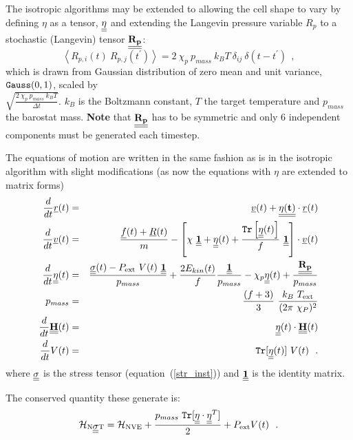 The isotropic algorithms may be extended to allowing
the cell shape to vary by defining $\eta$ as a tensor, $\mbox{$\underline{\underline{\bf \eta}}$}$
and extending the Langevin pressure variable $R_{p}$ to a stochastic
(Langevin) tensor $\mbox{$\underline{\underline{\bf R_{p}}}$}$:
\begin{equation}
\left< R_{p,i}(t)~R_{p,j}(t^\prime)\right> = 2~\chi_{p}~p_{mass}~k_{B}T~\delta_{ij}~\delta(t-t^\prime)~~,
\end{equation}
which is drawn from Gaussian distribution of zero mean and
unit variance, ${\tt Gauss}(0,1)$, scaled by \\
$\sqrt{\frac{2~\chi_{p}~p_{mass}~k_{B}T}{\Delta t}}$.
$k_{B}$ is the Boltzmann constant, $T$ the target temperature
and $p_{mass}$ the barostat mass.  {\bf Note} that $\mbox{$\underline{\underline{\bf R_{p}}}$}$
has to be symmetric and only 6 independent components must
be generated each timestep.

The equations of motion are written in the same fashion as is in the
isotropic algorithm with slight modifications (as now the equations
with $\eta$ are extended to matrix forms)
\begin{eqnarray}
\frac{d}{dt} \mbox{$\underline{r}$}(t) &=& \mbox{$\underline{v}$}(t) + \mbox{$\underline{\underline{\bf \eta (t)}}$} \cdot \mbox{$\underline{r}$}(t) \nonumber \\
\frac{d}{dt} \mbox{$\underline{v}$}(t) &=& \frac{\mbox{$\underline{f}$}(t) + \mbox{$\underline{R}$}(t)}{m} - \left[ \chi~\mbox{$\underline{\underline{\bf 1}}$} +
\mbox{$\underline{\underline{\bf \eta}}$}(t) + \frac{{\tt Tr}\left[\mbox{$\underline{\underline{\bf \eta}}$}(t)\right]}{f}~\mbox{$\underline{\underline{\bf 1}}$} \right] \cdot \mbox{$\underline{v}$}(t) \nonumber \\
\frac{d}{dt}\mbox{$\underline{\underline{\bf \eta}}$}(t) &=& \frac{\mbox{$\underline{\underline{\bf \sigma}}$}(t) -
P_{\rm ext}~V(t)~\mbox{$\underline{\underline{\bf 1}}$}}{p_{mass}} + \frac{2 E_{kin}(t)}{f} \frac{\mbox{$\underline{\underline{\bf 1}}$}}{p_{mass}} -
\chi_{p} \mbox{$\underline{\underline{\bf \eta}}$}(t)  + \frac{\mbox{$\underline{\underline{\bf R_{p}}}$}}{p_{mass}} \\
p_{mass} &=& \frac{(f+3)}{3}~\frac{k_{B}~T_{\rm ext}}{(2 \pi~\chi_{P})^{2}} \nonumber \\
\frac{d}{dt}\mbox{$\underline{\underline{\bf H}}$}(t) &=& \mbox{$\underline{\underline{\bf \eta}}$}(t) \cdot \mbox{$\underline{\underline{\bf H}}$}(t) \nonumber \\
\frac{d}{dt} V(t) &=& {\tt Tr} [\mbox{$\underline{\underline{\bf \eta}}$}(t)]~V(t)~~. \nonumber
\end{eqnarray}
where $\mbox{$\underline{\underline{\bf \sigma}}$}$ is the stress tensor (equation~(\ref{str_inst}))
and $\mbox{$\underline{\underline{\bf 1}}$}$ is the identity matrix.

The conserved quantity these generate is:
\begin{equation}
{\cal H}_{\rm N\mbox{$\underline{\underline{\bf \sigma}}$}T} = {\cal H}_{\rm NVE} + {p_{mass}~{\tt Tr}[\mbox{$\underline{\underline{\bf \eta}}$} \cdot \mbox{$\underline{\underline{\bf \eta}}$}^{T}] \over 2} + P_{\rm ext} V(t)~~.
\end{equation}

